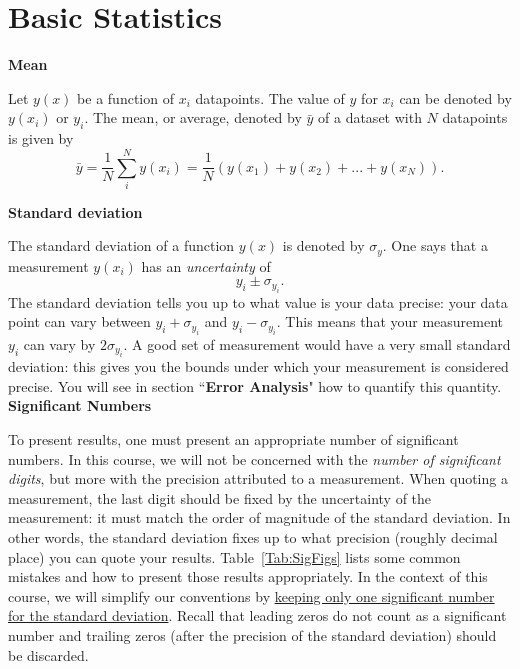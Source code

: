 \documentclass[12pt]{report}
\begin{document}
{}
\section*{Basic Statistics}

\noindent \large \textbf{Mean} \normalsize

Let $y(x)$ be a function of $x_i$ datapoints. The value of $y$ for $x_i$ can be denoted by $y(x_i)$ or $y_i$. The mean, or average, denoted by $\bar{y}$ of a dataset with $N$ datapoints is given by
\begin{equation}
\bar{y} = \frac{1}{N} \displaystyle \sum_{i}^N y(x_i) = \frac{1}{N} \left( y(x_1) + y(x_2) +... + y(x_N) \right).
\end{equation}

\noindent \large \textbf{Standard deviation} \normalsize

The standard deviation of a function $y(x)$ is denoted by $\sigma_y$. One says that a measurement $y(x_i)$ has an \textit{uncertainty} of
\begin{equation}
y_i \pm \sigma_{y_i}.
\end{equation}
The standard deviation tells you up to what value is your data precise: your data point can vary between $y_i + \sigma_{y_i}$ and $y_i - \sigma_{y_i}$. This means that your measurement $y_i$ can vary by $2 \sigma_{y_i}$. A good set of measurement would have a very small standard deviation: this gives you the bounds under which your measurement is considered precise. You will see in section ``\textbf{Error Analysis}" how to quantify this quantity. \\

\noindent \large \textbf{Significant Numbers} \normalsize

To present results, one must present an appropriate number of significant numbers. In this course, we will not be concerned with the \textit{number of significant digits}, but more with the precision attributed to a measurement. When quoting a measurement, the last digit should be fixed by the uncertainty of the measurement: it must match the order of magnitude of the standard deviation. In other words, the standard deviation fixes up to what precision (roughly decimal place) you can quote your results. Table~\ref{Tab:SigFigs} lists some common mistakes and how to present those results appropriately. In the context of this course, we will simplify our conventions by \underline{keeping only one significant number for the standard deviation}. Recall that leading zeros do not count as a significant number and trailing zeros (after the precision of the standard deviation) should be discarded.
\end{document}
